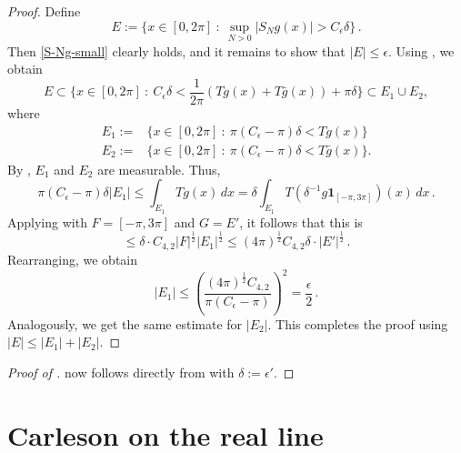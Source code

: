 \begin{proof}
\leanok
Define
\begin{equation*}
    E := \{x \in [0, 2\pi] \ : \ \sup_{N > 0} |S_N g (x)| > C_\epsilon \delta \} \,.
\end{equation*}
Then \eqref{S-Ng-small} clearly holds, and it remains to show that $|E| \le \epsilon$.
Using , we obtain
\begin{equation*}
    E \subset \{x\in [0,2\pi] \ : \ C_\epsilon \delta < \frac{1}{2\pi} (Tg(x) + T\bar{g}(x)) + \pi\delta\} \subset E_1 \cup E_2,
\end{equation*}
where
\begin{align*}
    E_1 :=& \{x\in [0,2\pi] \ : \ \pi(C_\epsilon - \pi) \delta < Tg(x)\} \\
    E_2 :=& \{x\in [0,2\pi] \ : \ \pi(C_\epsilon - \pi) \delta < T\bar{g}(x)\}.
\end{align*}
By , $E_1$ and $E_2$ are measurable. Thus,
\begin{equation*}
    \pi(C_\epsilon - \pi) \delta |E_1| \le \int_{E_1} Tg(x) \, dx = \delta \int_{E_1} T(\delta^{-1} g\mathbf{1}_{[-\pi,3\pi]})(x) \, dx \,.
\end{equation*}
Applying  with $F = [-\pi, 3\pi]$ and $G = E'$, it follows that this is
\begin{equation*}
    \le \delta \cdot C_{4,2} |F|^{\frac{1}{2}} |E_1|^{\frac{1}{2}} \le (4\pi)^\frac{1}{2} C_{4,2} \delta \cdot |E'|^{\frac{1}{2}}\,.
\end{equation*}
Rearranging, we obtain
\begin{equation*}
    |E_1| \le \left(\frac{(4\pi)^\frac{1}{2} C_{4,2}}{\pi(C_\epsilon - \pi)}\right)^2 = \frac{\epsilon}{2}\,.
\end{equation*}
Analogously, we get the same estimate for $|E_2|$. This completes the proof using $|E| \le |E_1| + |E_2|$.
\end{proof}

\begin{proof}[Proof of ]
\leanok
     now follows directly from  with $\delta:=\epsilon'$.
\end{proof}




\section{Carleson on the real line}
\label{10carleson}

